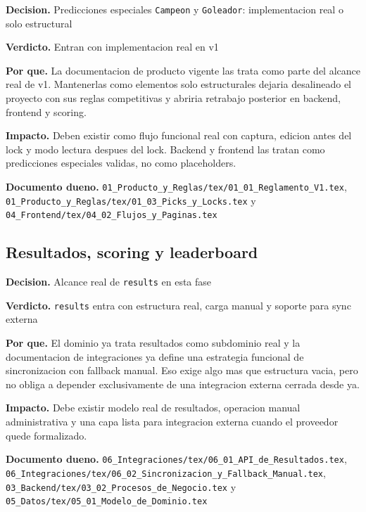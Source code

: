 \begin{docnote}
\textbf{Decision.} Predicciones especiales \texttt{Campeon} y \texttt{Goleador}: implementacion real o solo estructural

\textbf{Verdicto.} Entran con implementacion real en v1

\textbf{Por que.} La documentacion de producto vigente las trata como parte del alcance real de v1. Mantenerlas como elementos solo estructurales dejaria desalineado el proyecto con sus reglas competitivas y abriria retrabajo posterior en backend, frontend y scoring.

\textbf{Impacto.} Deben existir como flujo funcional real con captura, edicion antes del lock y modo lectura despues del lock. Backend y frontend las tratan como predicciones especiales validas, no como placeholders.

\textbf{Documento dueno.} \texttt{01\_Producto\_y\_Reglas/tex/01\_01\_Reglamento\_V1.tex}, \texttt{01\_Producto\_y\_Reglas/tex/01\_03\_Picks\_y\_Locks.tex} y \texttt{04\_Frontend/tex/04\_02\_Flujos\_y\_Paginas.tex}
\end{docnote}

\subsection{Resultados, scoring y leaderboard}

\begin{docnote}
\textbf{Decision.} Alcance real de \texttt{results} en esta fase

\textbf{Verdicto.} \texttt{results} entra con estructura real, carga manual y soporte para sync externa

\textbf{Por que.} El dominio ya trata resultados como subdominio real y la documentacion de integraciones ya define una estrategia funcional de sincronizacion con fallback manual. Eso exige algo mas que estructura vacia, pero no obliga a depender exclusivamente de una integracion externa cerrada desde ya.

\textbf{Impacto.} Debe existir modelo real de resultados, operacion manual administrativa y una capa lista para integracion externa cuando el proveedor quede formalizado.

\textbf{Documento dueno.} \texttt{06\_Integraciones/tex/06\_01\_API\_de\_Resultados.tex}, \texttt{06\_Integraciones/tex/06\_02\_Sincronizacion\_y\_Fallback\_Manual.tex}, \texttt{03\_Backend/tex/03\_02\_Procesos\_de\_Negocio.tex} y \texttt{05\_Datos/tex/05\_01\_Modelo\_de\_Dominio.tex}
\end{docnote}

